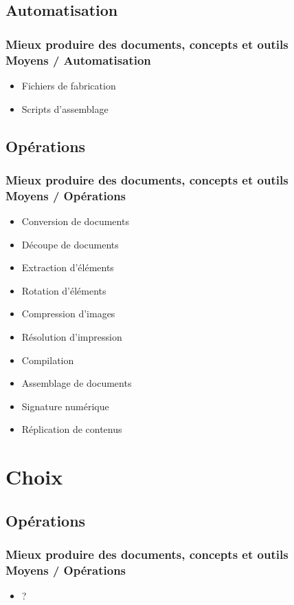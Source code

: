 \documentclass{beamer}
\def\hititle{Mieux produire des documents}
\def\lotitle{concepts et outils}
\def\fulltitle{\hititle, \lotitle}
\begin{document}
\subsection{Automatisation}
\begin{frame}
\frametitle{\fulltitle\\Moyens / Automatisation}
\begin{itemize}
\item<1-> Fichiers de fabrication
\item<2-> Scripts d’assemblage
\end{itemize}
\end{frame}
\subsection{Opérations}
\begin{frame}
\frametitle{\fulltitle\\Moyens / Opérations}
\begin{itemize}
\item<1-> Conversion de documents
\item<2-> Découpe de documents
\item<3-> Extraction d’éléments
\item<4-> Rotation d’éléments
\item<5-> Compression d’images
\item<6-> Résolution d’impression
\item<7-> Compilation
\item<8-> Assemblage de documents
\item<9-> Signature numérique
\item<10-> Réplication de contenus
\end{itemize}
\end{frame}
\section{Choix}
\subsection{Opérations}
\begin{frame}
\frametitle{\fulltitle\\Moyens / Opérations}
\begin{itemize}
\item<1-> ?
\end{itemize}
\end{frame}
\end{document}
